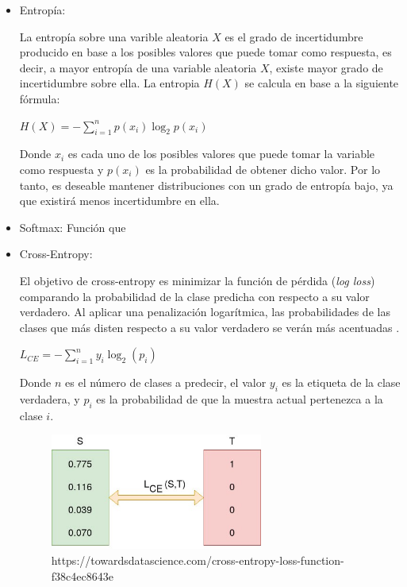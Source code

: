             \begin{itemize}
                \item Entropía:

                    La entropía sobre una varible aleatoria $X$ es el grado de incertidumbre producido en base a los posibles valores que puede tomar como respuesta, es decir, a mayor entropía de una variable aleatoria $X$, existe mayor grado de incertidumbre sobre ella. La entropia $H(X)$ se calcula en base a la siguiente fórmula:

                    \begin{center}
                        $H(X) = -\sum_{i = 1}^n p(x_i) \log_2 p(x_i)$
                    \end{center}

                    Donde $x_i$ es cada uno de los posibles valores que puede tomar la variable como respuesta y $p(x_i)$ es la probabilidad de obtener dicho valor. Por lo tanto, es deseable mantener distribuciones con un grado de entropía bajo, ya que existirá menos incertidumbre en ella.


                \item Softmax:
                    Función que 

                \item Cross-Entropy:

                    El objetivo de cross-entropy es minimizar la función de pérdida (\textit{log loss}) comparando la probabilidad de la clase predicha con respecto a su valor verdadero. Al aplicar una penalización logarítmica, las probabilidades de las clases que más disten respecto a su valor verdadero se verán más acentuadas \cite{Cross-Entropy}.

                    \begin{center}
                        $L_{CE} = -\sum_{i = 1}^n y_i \log_2(p_i)$
                    \end{center}

                    Donde $n$ es el número de clases a predecir, el valor $y_i$ es la etiqueta de la clase verdadera, y $p_i$ es la probabilidad de que la muestra actual pertenezca a la clase $i$.

                    \begin{figure}[h]
                        \centering
                        \includegraphics[width=7cm]{archivos/CNN/CrossEntropy}
                        \caption{https://towardsdatascience.com/cross-entropy-loss-function-f38c4ec8643e}
                        \label{CrossEntropyImage}
                     \end{figure}


\end{itemize}
